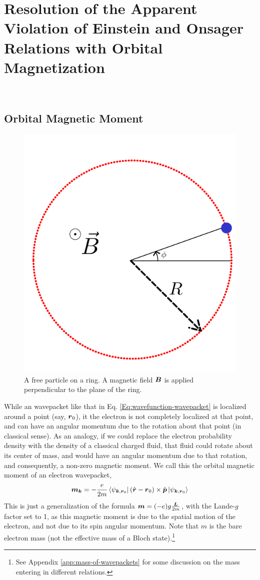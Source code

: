 \documentclass{report}
\renewcommand\vec[1]{\ensuremath\boldsymbol{#1}} %
\begin{document}
\chapter{Resolution of the Apparent Violation of Einstein and Onsager Relations with Orbital Magnetization}~\label{chap:OrbMag}

\section{Orbital Magnetic Moment} \label{sec:OrbMagMom}
\begin{figure}
	\centering
	\includegraphics[width=0.3\linewidth]{particle-on-a-ring}
	\caption{A free particle on a ring. A magnetic field $\vec{B}$ is applied perpendicular to the plane of the ring.}
	\label{fig:particle-on-a-ring}
\end{figure}
While an wavepacket like that in Eq. \eqref{Eq:wavefunction-wavepacket} is localized around a point (say, $\vec{r}_0$), it the electron is not completely localized at that point, and can have an angular momentum due to the rotation about that point (in classical sense). As an analogy, if we could replace the electron probability density with the density of a classical charged fluid, that fluid could rotate about its center of mass, and would have an angular momentum due to that rotation, and consequently, a non-zero magnetic moment. We call this the orbital magnetic moment of an electron wavepacket,
\begin{equation}\label{Eq:OrbitalMagneticMomentExpression}
	\vec{m}_{\vec{k}} = -\frac{e}{2 m} \bra{\psi_{\vec{k}, \vec{r}_0}}(\hat{\vec{r}} - \vec{r}_0)\times\hat{\vec{p}}\ket{\psi_{\vec{k}, \vec{r}_0}}
\end{equation}
This is just a generalization of the formula $\vec{m} = (-e)g \frac{\vec{L}}{2 m}$, with the Lande-$g$ factor set to 1, as this magnetic moment is due to the spatial motion of the electron, and not due to its spin angular momentum.
Note that $m$ is the bare electron mass (not the effective mass of a Bloch state).\footnote{See Appendix \ref{app:mass-of-wavepackets} for some discussion on the mass entering in different relations.}
\end{document}
